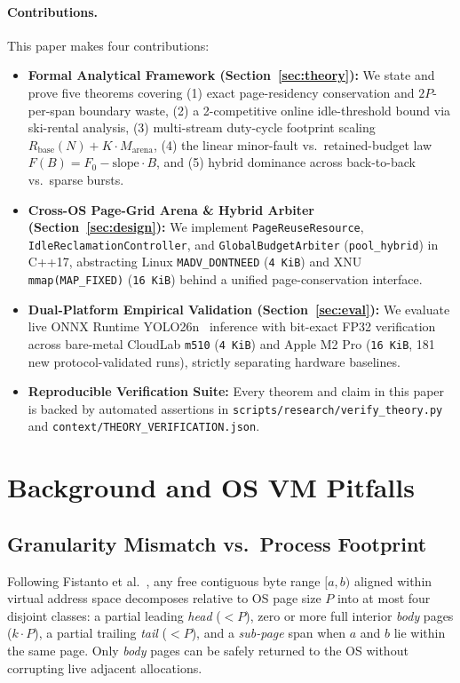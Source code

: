 \documentclass[sigconf,screen]{acmart}
\begin{document}
\paragraph{Contributions.} This paper makes four contributions:
\begin{itemize}
  \item \textbf{Formal Analytical Framework (Section~\ref{sec:theory}):} We state and prove five theorems covering (1) exact page-residency conservation and $2P$-per-span boundary waste, (2) a 2-competitive online idle-threshold bound via ski-rental analysis, (3) multi-stream duty-cycle footprint scaling $R_{\text{base}}(N) + K \cdot M_{\text{arena}}$, (4) the linear minor-fault vs.\ retained-budget law $F(B) = F_0 - \text{slope}\cdot B$, and (5) hybrid dominance across back-to-back vs.\ sparse bursts.
  \item \textbf{Cross-OS Page-Grid Arena \& Hybrid Arbiter (Section~\ref{sec:design}):} We implement \texttt{PageReuseResource}, \texttt{IdleReclamation\allowbreak Controller}, and \texttt{GlobalBudgetArbiter} (\texttt{pool\_hybrid}) in C++17, abstracting Linux \texttt{MADV\_\allowbreak DONTNEED} (\texttt{4~KiB}) and XNU \texttt{mmap(MAP\_FIXED)} (\texttt{16~KiB}) behind a unified page-conservation interface.
  \item \textbf{Dual-Platform Empirical Validation (Section~\ref{sec:eval}):} We evaluate live ONNX Runtime YOLO26n~\cite{ultralytics2026yolo26} inference with bit-exact FP32 verification across bare-metal CloudLab \texttt{m510} (\texttt{4~KiB}) and Apple M2 Pro (\texttt{16~KiB}, 181 new protocol-validated runs), strictly separating hardware baselines.
  \item \textbf{Reproducible Verification Suite:} Every theorem and claim in this paper is backed by automated assertions in \texttt{scripts/research/\allowbreak verify\_theory.py} and \texttt{context/\allowbreak THEORY\_VERIFICATION.json}.
\end{itemize}

\section{Background and OS VM Pitfalls}
\label{sec:background}

\subsection{Granularity Mismatch vs.\ Process Footprint}
Following Fistanto et al.~\cite{fistanto2023lostbytes}, any free contiguous byte range $[a, b)$ aligned within virtual address space decomposes relative to OS page size $P$ into at most four disjoint classes: a partial leading \emph{head} ($< P$), zero or more full interior \emph{body} pages ($k \cdot P$), a partial trailing \emph{tail} ($< P$), and a \emph{sub-page} span when $a$ and $b$ lie within the same page. Only \emph{body} pages can be safely returned to the OS without corrupting live adjacent allocations.
\end{document}
